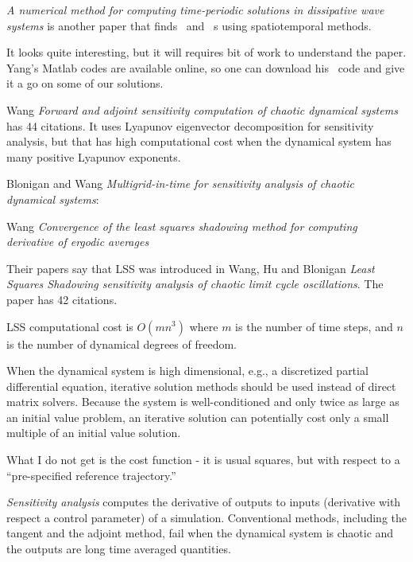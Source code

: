\begin{description}
 {
 {\em A numerical method for computing time-periodic solutions
in dissipative wave systems} is another paper that finds \KS\ and \cGL\ {\rpo}s
using spatiotemporal methods.

It looks quite interesting, but it will requires bit of work to understand the
paper. Yang's Matlab codes are available
 {online}, so one can download
his \KS\ code and give it a go on some of our solutions.
   
Wang
{\em Forward and adjoint sensitivity computation of chaotic dynamical systems}
has 44 citations.
It uses Lyapunov eigenvector decomposition for sensitivity analysis, but
that has high computational cost when the dynamical system has many
positive Lyapunov exponents.

Blonigan and Wang
{\em Multigrid-in-time for sensitivity analysis of chaotic dynamical systems}:

Wang {\em Convergence of the least squares shadowing method for
computing derivative of ergodic averages}

Their papers say that LSS was introduced in
Wang, Hu and Blonigan {\em {Least Squares Shadowing} sensitivity
analysis of chaotic limit cycle oscillations}. The paper has 42 citations.

LSS computational cost is $O(mn^3)$ where $m$ is the number of time steps, and
$n$ is the number of dynamical degrees of freedom.

When the dynamical system is high dimensional, e.g., a discretized
partial differential equation, iterative solution methods should be used
instead of direct matrix solvers. Because the system is well-conditioned
and only twice as large as an initial value problem, an iterative
solution can potentially cost only a small multiple of an initial value
solution.

What I do not get is
the cost function - it is usual squares, but with respect to a
``pre-specified reference trajectory.''

\emph{Sensitivity analysis} computes the derivative of outputs to inputs
(derivative with respect a control parameter) of a
simulation. Conventional methods, including the tangent and the adjoint method,
fail when the dynamical system is chaotic and the outputs are long time averaged
quantities.

}
\end{description}
